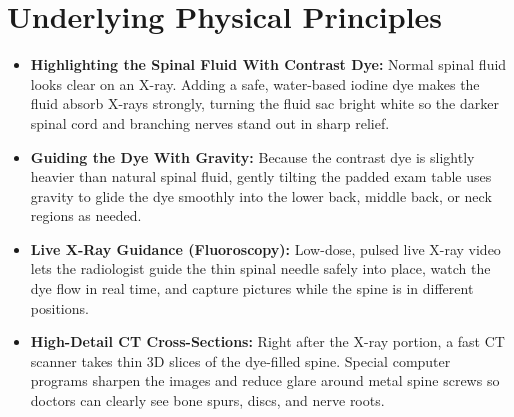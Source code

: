 \section{Underlying Physical Principles}
\begin{itemize}
    \item \textbf{Highlighting the Spinal Fluid With Contrast Dye:} Normal spinal fluid looks clear on an X-ray. Adding a safe, water-based iodine dye makes the fluid absorb X-rays strongly, turning the fluid sac bright white so the darker spinal cord and branching nerves stand out in sharp relief.
    \item \textbf{Guiding the Dye With Gravity:} Because the contrast dye is slightly heavier than natural spinal fluid, gently tilting the padded exam table uses gravity to glide the dye smoothly into the lower back, middle back, or neck regions as needed.
    \item \textbf{Live X-Ray Guidance (Fluoroscopy):} Low-dose, pulsed live X-ray video lets the radiologist guide the thin spinal needle safely into place, watch the dye flow in real time, and capture pictures while the spine is in different positions.
    \item \textbf{High-Detail CT Cross-Sections:} Right after the X-ray portion, a fast CT scanner takes thin 3D slices of the dye-filled spine. Special computer programs sharpen the images and reduce glare around metal spine screws so doctors can clearly see bone spurs, discs, and nerve roots.
\end{itemize}

